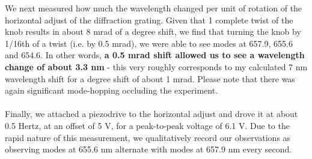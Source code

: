 \documentclass[10pt,a4paper]{article}
\begin{document}
\noindent We next measured how much the wavelength changed per unit of rotation of the horizontal adjust of the diffraction grating. Given that 1 complete twist of the knob results in about 8 mrad of a degree shift, we find that turning the knob by 1/16th of a twist (i.e. by 0.5 mrad), we were able to see modes at 657.9, 655.6 and 654.6. In other words, \textbf{a 0.5 mrad shift allowed us to see a wavelength change of about 3.3 nm} - this very roughly corresponds to my calculated 7 nm wavelength shift for a degree shift of about 1 mrad. Please note that there was again significant mode-hopping occluding the experiment.\\
\\
Finally, we attached a piezodrive to the horizontal adjust and drove it at about 0.5 Hertz, at an offset of 5 V, for a peak-to-peak voltage of 6.1 V. Due to the rapid nature of this measurement, we qualitatively record our observations as observing modes at 655.6 nm alternate with modes at 657.9 nm every second. 
\end{document}
